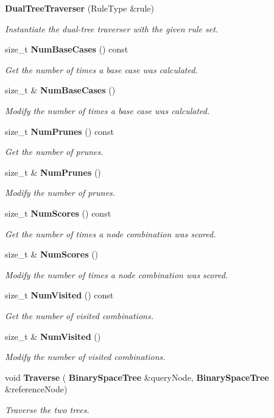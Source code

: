 \begin{DoxyCompactItemize}
\item 
\textbf{ Dual\+Tree\+Traverser} (Rule\+Type \&rule)
\begin{DoxyCompactList}\small\item\em Instantiate the dual-\/tree traverser with the given rule set. \end{DoxyCompactList}\item 
size\+\_\+t \textbf{ Num\+Base\+Cases} () const
\begin{DoxyCompactList}\small\item\em Get the number of times a base case was calculated. \end{DoxyCompactList}\item 
size\+\_\+t \& \textbf{ Num\+Base\+Cases} ()
\begin{DoxyCompactList}\small\item\em Modify the number of times a base case was calculated. \end{DoxyCompactList}\item 
size\+\_\+t \textbf{ Num\+Prunes} () const
\begin{DoxyCompactList}\small\item\em Get the number of prunes. \end{DoxyCompactList}\item 
size\+\_\+t \& \textbf{ Num\+Prunes} ()
\begin{DoxyCompactList}\small\item\em Modify the number of prunes. \end{DoxyCompactList}\item 
size\+\_\+t \textbf{ Num\+Scores} () const
\begin{DoxyCompactList}\small\item\em Get the number of times a node combination was scored. \end{DoxyCompactList}\item 
size\+\_\+t \& \textbf{ Num\+Scores} ()
\begin{DoxyCompactList}\small\item\em Modify the number of times a node combination was scored. \end{DoxyCompactList}\item 
size\+\_\+t \textbf{ Num\+Visited} () const
\begin{DoxyCompactList}\small\item\em Get the number of visited combinations. \end{DoxyCompactList}\item 
size\+\_\+t \& \textbf{ Num\+Visited} ()
\begin{DoxyCompactList}\small\item\em Modify the number of visited combinations. \end{DoxyCompactList}\item 
void \textbf{ Traverse} (\textbf{ Binary\+Space\+Tree} \&query\+Node, \textbf{ Binary\+Space\+Tree} \&reference\+Node)
\begin{DoxyCompactList}\small\item\em Traverse the two trees. \end{DoxyCompactList}\end{DoxyCompactItemize}


